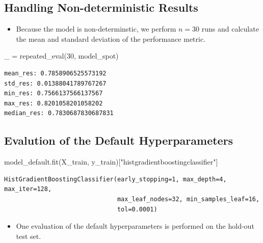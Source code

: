 \documentclass[
  letterpaper,
  DIV=11,
  numbers=noendperiod]{scrreprt}
\newenvironment{Shaded}{\begin{snugshade}}{\end{snugshade}}
\newcommand{\DecValTok}[1]{\textcolor[rgb]{0.68,0.00,0.00}{#1}}
\newcommand{\NormalTok}[1]{\textcolor[rgb]{0.00,0.23,0.31}{#1}}
\newcommand{\OperatorTok}[1]{\textcolor[rgb]{0.37,0.37,0.37}{#1}}
\newcommand{\StringTok}[1]{\textcolor[rgb]{0.13,0.47,0.30}{#1}}
\providecommand{\tightlist}{%
  \setlength{\itemsep}{0pt}\setlength{\parskip}{0pt}}\usepackage{longtable,booktabs,array}
\begin{document}
\hypertarget{handling-non-deterministic-results-1}{%
\subsection{Handling Non-deterministic
Results}\label{handling-non-deterministic-results-1}}

\begin{itemize}
\tightlist
\item
  Because the model is non-determinstic, we perform \(n=30\) runs and
  calculate the mean and standard deviation of the performance metric.
\end{itemize}

\begin{Shaded}
\begin{Highlighting}[]
\NormalTok{\_ }\OperatorTok{=}\NormalTok{ repeated\_eval(}\DecValTok{30}\NormalTok{, model\_spot)}
\end{Highlighting}
\end{Shaded}

\begin{verbatim}
mean_res: 0.7858906525573192
std_res: 0.01388041789767267
min_res: 0.7566137566137567
max_res: 0.8201058201058202
median_res: 0.7830687830687831
\end{verbatim}

\hypertarget{evalution-of-the-default-hyperparameters-1}{%
\subsection{Evalution of the Default
Hyperparameters}\label{evalution-of-the-default-hyperparameters-1}}

\begin{Shaded}
\begin{Highlighting}[]
\NormalTok{model\_default.fit(X\_train, y\_train)[}\StringTok{"histgradientboostingclassifier"}\NormalTok{]}
\end{Highlighting}
\end{Shaded}

\begin{verbatim}
HistGradientBoostingClassifier(early_stopping=1, max_depth=4, max_iter=128,
                               max_leaf_nodes=32, min_samples_leaf=16,
                               tol=0.0001)
\end{verbatim}

\begin{itemize}
\tightlist
\item
  One evaluation of the default hyperparameters is performed on the
  hold-out test set.
\end{itemize}
\end{document}
